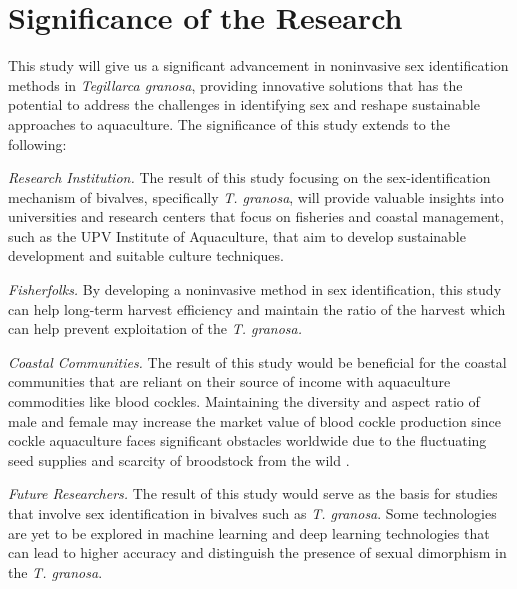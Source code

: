 \section{Significance of the Research}
\label{sec:significance}

This study will give us a significant advancement in noninvasive sex identification methods in \textit{Tegillarca granosa}, providing innovative solutions that has the potential to address the challenges in identifying sex and reshape sustainable approaches to aquaculture. The significance of this study extends to the following:

\textit{Research Institution.} The result of this study focusing on the sex-identification mechanism of bivalves, specifically \textit{T. granosa}, will provide valuable insights into universities and research centers that focus on fisheries and coastal management, such as the UPV Institute of Aquaculture, that aim to develop sustainable development and suitable culture techniques.

\textit{Fisherfolks.} By developing a noninvasive method in sex identification, this study can help long-term harvest efficiency and maintain the ratio of the harvest which can help prevent exploitation of the \textit{T. granosa.}

\textit{Coastal Communities.} The result of this study would be beneficial for the coastal communities that are reliant on their source of income with aquaculture commodities like blood cockles. Maintaining the diversity and aspect ratio of male and female may increase the market value of blood cockle production since cockle aquaculture faces significant obstacles worldwide due to the fluctuating seed supplies and scarcity of broodstock from the wild \cite{miranda2023}. 

\textit{Future Researchers.} The result of this study would serve as the basis for studies that involve sex identification in bivalves such as \textit{T. granosa}. Some technologies are yet to be explored in machine learning and deep learning technologies that can lead to higher accuracy and distinguish the presence of sexual dimorphism in the \textit{T. granosa}.


